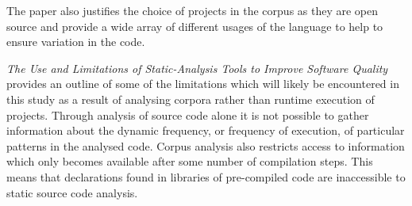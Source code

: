 The paper also justifies the choice of projects in the corpus as they are open source and provide a wide array of different usages of the language to help to ensure variation in the code.
\newline

\textit{The Use and Limitations of Static-Analysis Tools to Improve Software Quality~\cite{StaticAnalysisLimits}} provides an outline of some of the limitations which will likely be encountered in this study as a result of analysing corpora rather than runtime execution of projects. Through analysis of source code alone it is not possible to gather information about the dynamic frequency, or frequency of execution, of particular patterns in the analysed code. Corpus analysis also restricts access to information which only becomes available after some number of compilation steps. This means that declarations found in libraries of pre-compiled code are inaccessible to static source code analysis.





